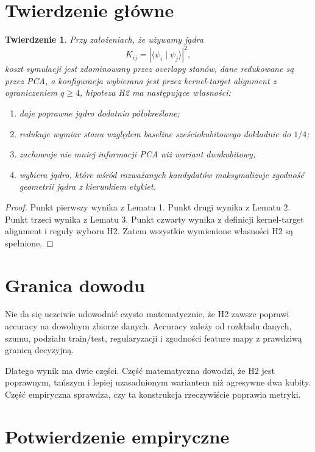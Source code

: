 \documentclass[11pt,a4paper]{article}
\newtheorem{theorem}{Twierdzenie}
\begin{document}
\section{Twierdzenie główne}

\begin{theorem}
Przy założeniach, że używamy jądra
\[
K_{ij}=|\langle\psi_i\mid\psi_j\rangle|^2,
\]
koszt symulacji jest zdominowany przez overlapy stanów, dane redukowane są przez PCA, a konfiguracja wybierana jest przez kernel-target alignment z ograniczeniem $q\ge4$, hipoteza H2 ma następujące własności:
\begin{enumerate}
\item daje poprawne jądro dodatnio półokreślone;
\item redukuje wymiar stanu względem baseline sześciokubitowego dokładnie do $1/4$;
\item zachowuje nie mniej informacji PCA niż wariant dwukubitowy;
\item wybiera jądro, które wśród rozważanych kandydatów maksymalizuje zgodność geometrii jądra z kierunkiem etykiet.
\end{enumerate}
\end{theorem}

\begin{proof}
Punkt pierwszy wynika z Lematu 1. Punkt drugi wynika z Lematu 2. Punkt trzeci wynika z Lematu 3. Punkt czwarty wynika z definicji kernel-target alignment i reguły wyboru H2. Zatem wszystkie wymienione własności H2 są spełnione.
\end{proof}

\section{Granica dowodu}

Nie da się uczciwie udowodnić czysto matematycznie, że H2 zawsze poprawi accuracy na dowolnym zbiorze danych. Accuracy zależy od rozkładu danych, szumu, podziału train/test, regularyzacji i zgodności feature mapy z prawdziwą granicą decyzyjną.

Dlatego wynik ma dwie części. Część matematyczna dowodzi, że H2 jest poprawnym, tańszym i lepiej uzasadnionym wariantem niż agresywne dwa kubity. Część empiryczna sprawdza, czy ta konstrukcja rzeczywiście poprawia metryki.

\section{Potwierdzenie empiryczne}
\end{document}
